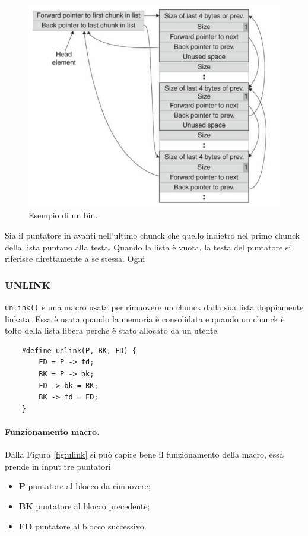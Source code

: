 \begin{figure}[H]
	\centering
    \includegraphics[width=12cm, keepaspectratio]{santini/img/cap_4/bin.png}
	\caption{Esempio di un bin.}\label{fig:bin}
\end{figure}
Sia il puntatore in avanti nell'ultimo chunck che quello indietro nel primo chunck della lista puntano alla testa. Quando la lista è vuota, la testa del puntatore si riferisce direttamente a se stessa.  Ogni 
\subsubsection{UNLINK}
\verb|unlink()| è una macro usata per rimuovere un chunck dalla sua lista doppiamente linkata. Essa è usata quando la memoria è consolidata e quando un chunck è tolto della lista libera perchè è stato allocato da un utente.
\begin{verbatim}
    #define unlink(P, BK, FD) {
        FD = P -> fd;
        BK = P -> bk;
        FD -> bk = BK;
        BK -> fd = FD;
    }
\end{verbatim}

\paragraph{Funzionamento macro.}
Dalla Figura \ref{fig:ulink} si può capire bene il funzionamento della macro, essa prende in input tre puntatori
 \begin{itemize}
     \item \textbf{P} puntatore al blocco da rimuovere;
     \item \textbf{BK} puntatore al blocco precedente;
     \item \textbf{FD} puntatore al blocco successivo.
 \end{itemize}


